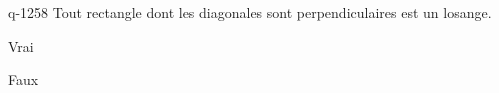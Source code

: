 \begin{truefalse}{q-1258}
Tout rectangle dont les diagonales sont perpendiculaires est un losange.
\item* Vrai
\item Faux
\end{truefalse}

